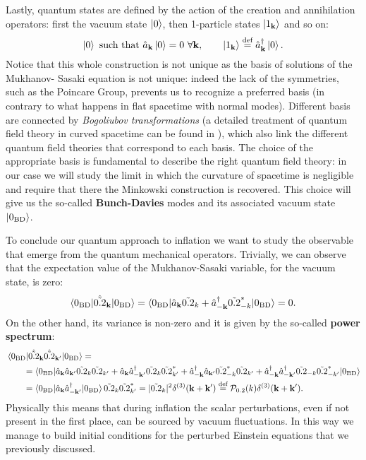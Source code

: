 Lastly, quantum states are defined by the action of the creation and annihilation operators: first the vacuum state $\ket{0}$, then 1-particle states $\ket{1_\mathbf{k}}$ and so on:
\begin{equation}
    \ket{0}\text{ such that }\hat{a}_\mathbf{k}\ket{0}=0\ \forall \mathbf{k},\qquad \ket{1_\mathbf{k}}\stackrel{\text{def}}{=}\hat{a}^\dagger_\mathbf{k}\ket{0}.
\end{equation}
Notice that this whole construction is not unique as the basis of solutions of the Mukhanov- Sasaki equation is not unique: indeed the lack of the symmetries, such as the Poincare Group, prevents us to recognize a preferred basis (in contrary to what happens in flat spacetime with normal modes). Different basis are connected by \emph{Bogoliubov transformations} (a detailed treatment of quantum field theory in curved spacetime can be found in \cite{Birrell:1982ix}), which also link the different quantum field theories that correspond to each basis. The choice of the appropriate basis is fundamental to describe the right quantum field theory: in our case we will study the limit in which the curvature  of spacetime is negligible and require that there the Minkowski construction is recovered. This choice will give us the so-called \textbf{Bunch-Davies} modes and its associated vacuum state $\ket{0_\text{BD}}$.

To conclude our quantum approach to inflation we want to study the observable that emerge from the quantum mechanical operators. Trivially, we can observe that the expectation value of the Mukhanov-Sasaki variable, for the vacuum state, is zero:
$$\braket{0_\text{BD}|\hat{\tilde{0.2}}_\mathbf{k}|0_\text{BD}}=\braket{0_\text{BD}|\hat a_{\mathbf k}\tilde{0.2}_k+\hat a_{-\mathbf k}^{\dagger}\tilde{0.2}^*_{-k}|0_\text{BD}}=0.$$
On the other hand, its variance is non-zero and it is given by the so-called \textbf{power spectrum}:
\begin{align*}
   &\braket{0_\text{BD}|\hat{\tilde{0.2}}_\mathbf{k}\hat{\tilde{0.2}}_\mathbf{k'}|0_\text{BD}}=\\ &\qquad=\braket{0_\text{BD}|\hat a_{\mathbf k}\hat a_{\mathbf k'}\tilde{0.2}_k \tilde{0.2}_{k'}+\hat a_{\mathbf k}\hat a_{-\mathbf k'}^{\dagger}\tilde{0.2}_{k} \tilde{0.2}^*_{k'}+\hat a_{-\mathbf k}^{\dagger}\hat a_{\mathbf k'}\tilde{0.2}_{-k}^* \tilde{0.2}_{k'}+\hat a_{-\mathbf k}^\dagger\hat a_{-\mathbf k'}^{\dagger}\tilde{0.2}_{-k} \tilde{0.2}^*_{-k'}|0_\text{BD}}\\&\qquad=\braket{0_\text{BD}|\hat a_{\mathbf k}\hat a_{-\mathbf k'}^{\dagger}|0_\text{BD}}\tilde{0.2}_{k} \tilde{0.2}^*_{k'}=|\tilde{0.2}_{k}|^2\delta^{(3)}(\mathbf{k+k'})\stackrel{\text{def}}{=}\mathcal{P}_{0.2}(k)\delta^{(3)}(\mathbf{k+k'}).
\end{align*} 
Physically this means that during inflation the scalar perturbations, even if not present in the first place, can be sourced by vacuum fluctuations. In this way we manage to build initial conditions for the perturbed Einstein equations that we previously discussed.

